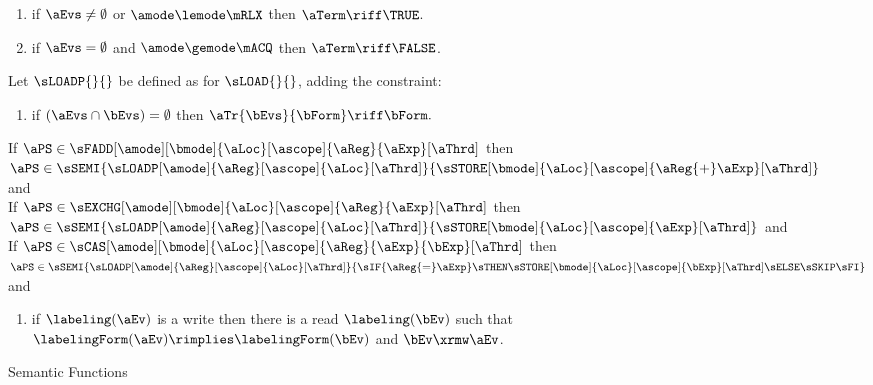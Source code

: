 \begin{figure}
\begin{multicols}{2}
\begin{enumerate}[topsep=0pt,label=(\textsc{r}\arabic*),ref=\textsc{r}\arabic*]
\begin{enumerate}[leftmargin=0pt]
      \item \label{read-term-nonempty}
        if $\aEvs\neq\emptyset$ or $\amode\lemode\mRLX$ then $\aTerm \riff \TRUE$. 
      \item \label{read-term-empty}
        if $\aEvs=\emptyset$ and $\amode\gemode\mACQ$ then $\aTerm \riff \FALSE$. 
      \end{enumerate}      
    \end{enumerate}
  \end{multicols}
  \medskip

  \noindent
  Let $\sLOADP{}{}$ be defined as for $\sLOAD{}{}$, adding the constraint:
  \begin{enumerate}
  \item[{\labeltextXX{4d}{r}{read-tau-rmw}}]
    if $(\aEvs\cap\bEvs)=\emptyset$ then
    \begin{math}
      \aTr{\bEvs}{\bForm} \riff
      \bForm.
    \end{math}
  \end{enumerate}
  If $\aPS\in\sFADD[\amode][\bmode]{\aLoc}[\ascope]{\aReg}{\aExp}[\aThrd]$ then
  \begin{math}
    \aPS\in\sSEMI{
      \sLOADP[\amode]{\aReg}[\ascope]{\aLoc}[\aThrd]
    }{
      \sSTORE[\bmode]{\aLoc}[\ascope]{\aReg{+}\aExp}[\aThrd]
    }
  \end{math}
  and %
  \\
  If $\aPS\in\sEXCHG[\amode][\bmode]{\aLoc}[\ascope]{\aReg}{\aExp}[\aThrd]$ then
  \begin{math}
    \aPS\in\sSEMI{    
      \sLOADP[\amode]{\aReg}[\ascope]{\aLoc}[\aThrd]
    }{
      \sSTORE[\bmode]{\aLoc}[\ascope]{\aExp}[\aThrd]
    }
  \end{math}
  and %
  \\
  If $\aPS\in\sCAS[\amode][\bmode]{\aLoc}[\ascope]{\aReg}{\aExp}{\bExp}[\aThrd]$ then\\\quad
  \begin{math}
    \aPS\in\sSEMI{
      \sLOADP[\amode]{\aReg}[\ascope]{\aLoc}[\aThrd]
    }{
      \sIF{\aReg{=}\aExp}\sTHEN\sSTORE[\bmode]{\aLoc}[\ascope]{\bExp}[\aThrd]\sELSE\sSKIP\sFI
    }
  \end{math}
  and %
  \begin{enumerate}[label=(\textsc{u}\arabic*),ref=\textsc{u}\arabic*]
    \setcounter{enumi}{\value{Brmw}}
  \item if $\labeling(\aEv)$ is a write then there is a read $\labeling(\bEv)$ such that 
    $\labelingForm(\aEv)\rimplies\labelingForm(\bEv)$ and
    $\bEv\xrmw\aEv$.
  \end{enumerate}

  \caption{Semantic Functions}
  \label{fig:sem}
\end{figure}
